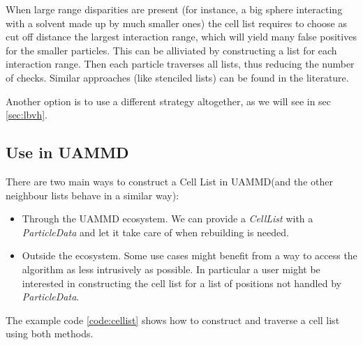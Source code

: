 \documentclass[ twoside,openright,titlepage,numbers=noenddot,%
headinclude,footinclude,cleardoublepage=empty,abstract=on,
BCOR=5mm,paper=a4,fontsize=11pt, dvipsnames
]{scrreprt}
\newcommand{\uammd}{\gls{UAMMD}\xspace}
\begin{document}
When large range disparities are present (for instance, a big sphere interacting with a solvent made up by much smaller ones) the cell list requires to choose as cut off distance the largest interaction range, which will yield many false positives for the smaller particles. This can be alliviated by constructing a list for each interaction range. Then each particle traverses all lists, thus reducing the number of checks. Similar approaches (like stenciled lists) can be found in the literature\cite{Howard2016}.

Another option is to use a different strategy altogether, as we will see in sec \ref{sec:lbvh}.
\subsection*{Use in UAMMD}
There are two main ways to construct a Cell List in \uammd (and the other neighbour lists behave in a similar way):
\begin{itemize}
\item Through the \uammd ecosystem.
  We can provide a \emph{CellList} with a \emph{ParticleData} and let it take care of when rebuilding is needed.
\item Outside the ecosystem.
  Some use cases might benefit from a way to access the algorithm as less intrusively as possible. In particular a user might be interested in constructing the cell list for a list of positions not handled by \emph{ParticleData}.
\end{itemize}
The example code \ref{code:cellist} shows how to construct and traverse a cell list using both methods.
\end{document}
